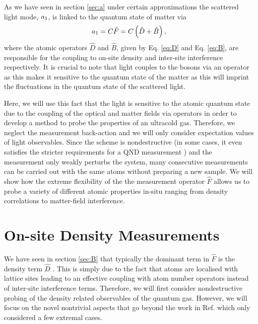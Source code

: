 As we have seen in section \ref{sec:a} under certain approximations
the scattered light mode, $a_1$, is linked to the quantum state of
matter via 
\begin{equation}
  \label{eq:a-3}
  a_1 = C \hat{F} = C \left(\hat{D} + \hat{B} \right),
\end{equation}
where the atomic operators $\hat{D}$ and $\hat{B}$, given by
Eq. \eqref{eq:D} and Eq. \eqref{eq:B}, are responsible for the
coupling to on-site density and inter-site interference
respectively. It is crucial to note that light couples to the bosons
via an operator as this makes it sensitive to the quantum state of the
matter as this will imprint the fluctuations in the quantum state of
the scattered light.

Here, we will use this fact that the light is sensitive to the atomic
quantum state due to the coupling of the optical and matter fields via
operators in order to develop a method to probe the properties of an
ultracold gas. Therefore, we neglect the measurement back-action and
we will only consider expectation values of light observables. Since
the scheme is nondestructive (in some cases, it even satisfies the
stricter requirements for a QND measurement \cite{mekhov2012,
  mekhov2007pra}) and the measurement only weakly perturbs the system,
many consecutive measurements can be carried out with the same atoms
without preparing a new sample. We will show how the extreme
flexibility of the the measurement operator $\hat{F}$ allows us to
probe a variety of different atomic properties in-situ ranging from
density correlations to matter-field interference.

\section{On-site Density Measurements}

We have seen in section \ref{sec:B} that typically the dominant term
in $\hat{F}$ is the density term $\hat{D}$ \cite{LP2009,
  mekhov2007pra, rist2010, lakomy2009, ruostekoski2009}. This is
simply due to the fact that atoms are localised with lattice sites
leading to an effective coupling with atom number operators instead of
inter-site interference terms. Therefore, we will first consider
nondestructive probing of the density related observables of the
quantum gas. However, we will focus on the novel nontrivial aspects
that go beyond the work in Ref. \cite{mekhov2012, mekhov2007prl,
  mekhov2007pra} which only considered a few extremal cases.

